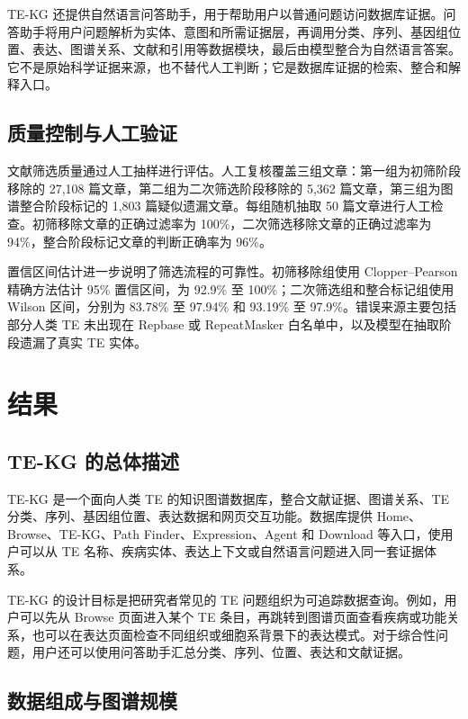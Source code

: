 \documentclass[12pt,a4paper,UTF8]{ctexart}
\begin{document}
TE-KG 还提供自然语言问答助手，用于帮助用户以普通问题访问数据库证据。问答助手将用户问题解析为实体、意图和所需证据层，再调用分类、序列、基因组位置、表达、图谱关系、文献和引用等数据模块，最后由模型整合为自然语言答案。它不是原始科学证据来源，也不替代人工判断；它是数据库证据的检索、整合和解释入口。

\subsection{质量控制与人工验证}

文献筛选质量通过人工抽样进行评估。人工复核覆盖三组文章：第一组为初筛阶段移除的 27,108 篇文章，第二组为二次筛选阶段移除的 5,362 篇文章，第三组为图谱整合阶段标记的 1,803 篇疑似遗漏文章。每组随机抽取 50 篇文章进行人工检查。初筛移除文章的正确过滤率为 100\%，二次筛选移除文章的正确过滤率为 94\%，整合阶段标记文章的判断正确率为 96\%。

置信区间估计进一步说明了筛选流程的可靠性。初筛移除组使用 Clopper--Pearson 精确方法估计 95\% 置信区间，为 92.9\% 至 100\%；二次筛选组和整合标记组使用 Wilson 区间，分别为 83.78\% 至 97.94\% 和 93.19\% 至 97.9\%。错误来源主要包括部分人类 TE 未出现在 Repbase 或 RepeatMasker 白名单中，以及模型在抽取阶段遗漏了真实 TE 实体。

\section{结果}

\subsection{TE-KG 的总体描述}

TE-KG 是一个面向人类 TE 的知识图谱数据库，整合文献证据、图谱关系、TE 分类、序列、基因组位置、表达数据和网页交互功能。数据库提供 Home、Browse、TE-KG、Path Finder、Expression、Agent 和 Download 等入口，使用户可以从 TE 名称、疾病实体、表达上下文或自然语言问题进入同一套证据体系。

TE-KG 的设计目标是把研究者常见的 TE 问题组织为可追踪数据查询。例如，用户可以先从 Browse 页面进入某个 TE 条目，再跳转到图谱页面查看疾病或功能关系，也可以在表达页面检查不同组织或细胞系背景下的表达模式。对于综合性问题，用户还可以使用问答助手汇总分类、序列、位置、表达和文献证据。

\subsection{数据组成与图谱规模}
\end{document}
